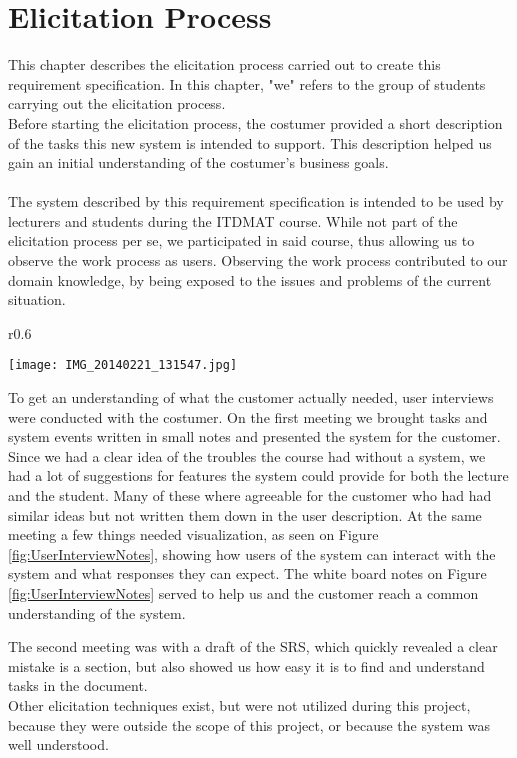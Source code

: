 \documentclass[Main]{subfiles}
\begin{document}
\chapter{Elicitation Process}\label{cha:Elicitation}

This chapter describes the elicitation process carried out to create this requirement specification. 
In this chapter, "we" refers to the group of students carrying out the elicitation process.
\\

Before starting the elicitation process, the costumer provided a short description of the tasks this new system is intended to support. 
This description helped us gain an initial understanding of the costumer's business goals.
\\
\\
The system described by this requirement specification is intended to be used by lecturers and students during the ITDMAT course. 
While not part of the elicitation process per se, we participated in said course, thus allowing us to observe the work process as users. 
Observing the work process contributed to our domain knowledge, by being exposed to the issues and problems of the current situation.
\\

\begin{wrapfigure}{r}{0.6\textwidth}
\vspace{-20pt}
\begin{center}
\texttt{[image: IMG\_20140221\_131547.jpg]}
\vspace{-5pt}
\end{center}
\vspace{-10pt}
\caption{Whiteboard notes created during user interview.}
\label{fig:UserInterviewNotes}
\vspace{-10pt}
\end{wrapfigure}


To get an understanding of what the customer actually needed, user interviews were conducted with the costumer. On the first meeting we brought tasks and system events written in small notes and presented the system for the customer. Since we had a clear idea of the troubles the course had without a system, we had a lot of suggestions for features the system could provide for both the lecture and the student.
Many of these where agreeable for the customer who had had similar ideas but not written them down in the user description. 
At the same meeting a few things needed visualization, as seen on Figure \ref{fig:UserInterviewNotes}, showing how users of the system can interact with the system and what responses they can expect. The white board notes on Figure \ref{fig:UserInterviewNotes} served to help us and the customer reach a common understanding of the system.

The second meeting was with a draft of the SRS, which quickly revealed a clear mistake is a section, but also showed us how easy it is to find and understand tasks in the document.
\\

Other elicitation techniques exist, but were not utilized during this project, because they were outside the scope of this project, or because the system was well understood.
\end{document}
